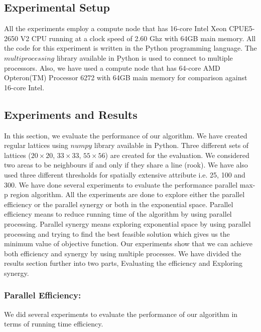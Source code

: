 \documentclass[conference]{IEEEtran}
\begin{document}
\subsection{Experimental Setup}
All the experiments employ a compute node that has 16-core Intel Xeon
CPUE5-2650 V2 CPU running at a clock speed of 2.60 Ghz with 64GB main memory.
All the code for this experiment is written in the Python programming language.
The $multiprocessing$ library available in Python is used to connect to multiple
processors. Also, we have used a compute node that has 64-core AMD Opteron(TM)
Processor 6272 with 64GB main memory for comparison against 16-core Intel.

\subsection{Experiments and Results}

In this section, we evaluate the performance of our algorithm. We have created
regular lattices using $numpy$ library available in Python. Three different sets
of lattices ($20\times 20$, $33\times 33$, $55\times 56$) are created for the
evaluation. We considered two areas to be neighbours if and only if they share a
line (rook). We have also used three different thresholds for spatially
extensive attribute i.e. 25, 100 and 300. We have done several experiments to
evaluate the performance parallel max-p region algorithm. All the experiments are done to explore either the parallel efficiency or the parallel synergy or both in the exponential space. Parallel efficiency means to reduce running time of the algorithm by using parallel processing. Parallel synergy means exploring exponential space by using parallel processing and trying to find the best feasible solution which gives us the minimum value of objective function. Our experiments show that we can achieve both efficiency and synergy by using multiple processes. We have divided the results section further into two parts, Evaluating the efficiency and Exploring synergy.

\subsubsection{Parallel Efficiency:}

We did several experiments to evaluate the performance of our algorithm in terms of running time efficiency. 
\end{document}
